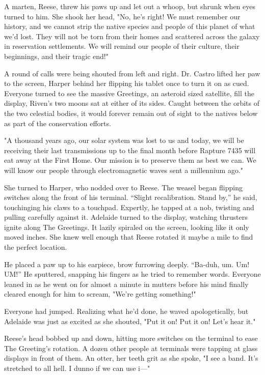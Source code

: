 A marten, Reese, threw his paws up and let out a whoop, but shrunk when eyes turned to him. She shook her head, "No, he's right! We must remember our history, and we cannot strip the native species and people of this planet of what we'd lost. They will not be torn from their homes and scattered across the galaxy in reservation settlements. We will remind our people of their culture, their beginnings, and their tragic end!"

A round of calls were being shouted from left and right. Dr. Castro lifted her paw to the screen, Harper behind her flipping his tablet once to turn it on as cued. Everyone turned to see the massive Greetings, an asteroid sized satellite, fill the display, Riven's two moons sat at either of its sides. Caught between the orbits of the two celestial bodies, it would forever remain out of sight to the natives below as part of the conservation efforts.

"A thousand years ago, our solar system was lost to us and today, we will be receiving their last transmissions up to the final month before Rapture 7435 will eat away at the First Home. Our mission is to preserve them as best we can. We will know our people through electromagnetic waves sent a millennium ago."

She turned to Harper, who nodded over to Reese. The weasel began flipping switches along the front of his terminal. ``Slight recalibration. Stand by,'' he said, touchinging his claws to a touchpad. Expertly, he tapped at a nob, twisting and pulling carefully against it. Adelaide turned to the display, watching thrusters ignite along The Greetings. It lazily spiraled on the screen, looking like it only moved inches. She knew well enough that Reese rotated it maybe a mile to find the perfect location.

He placed a paw up to his earpiece, brow furrowing deeply. ``Ba-duh, um. Um! UM!'' He sputtered, snapping his fingers as he tried to remember words. Everyone leaned in as he went on for almost a minute in mutters before his mind finally cleared enough for him to scream, "We're getting something!"

Everyone had jumped. Realizing what he'd done, he waved apologetically, but Adelaide was just as excited as she shouted, "Put it on! Put it on! Let's hear it."

Reese's head bobbed up and down, hitting more switches on the terminal to ease The Greeting's rotation. A dozen other people at terminals were tapping at glass displays in front of them. An otter, her teeth grit as she spoke, "I see a band. It's stretched to all hell. I dunno if we can use i---"

